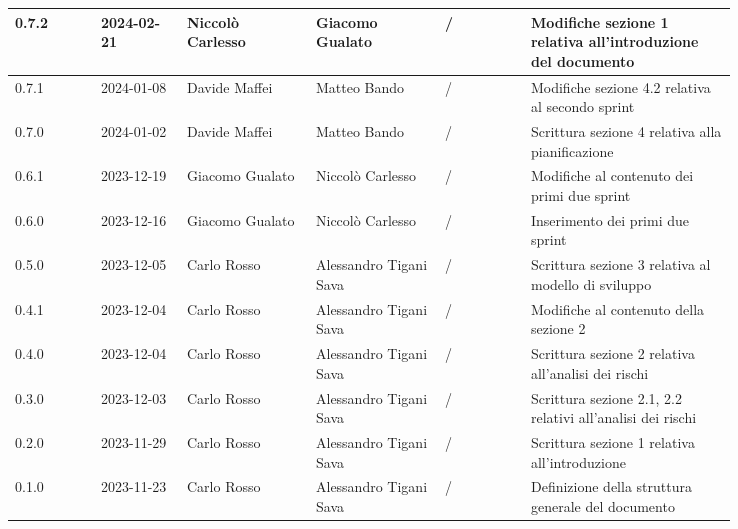 {\begin{longtable}{p{0.10\linewidth}p{0.10\linewidth}p{0.15\linewidth}p{0.15\linewidth}p{0.10\linewidth}p{0.24\linewidth}}
	  \hline
	  0.7.2             & 2024-02-21    & Niccolò Carlesso   & Giacomo Gualato        & /                    & Modifiche sezione 1 relativa all'introduzione del documento       \\
	  \hline
	  0.7.1             & 2024-01-08    & Davide Maffei      & Matteo Bando           & /                    & Modifiche sezione 4.2 relativa al secondo sprint                  \\
	  \hline
	  0.7.0             & 2024-01-02    & Davide Maffei      & Matteo Bando           & /                    & Scrittura sezione 4 relativa alla pianificazione                  \\
	  \hline
	  0.6.1             & 2023-12-19    & Giacomo Gualato    & Niccolò Carlesso       & /                    & Modifiche al contenuto dei primi due sprint                       \\
	  \hline
	  0.6.0             & 2023-12-16    & Giacomo Gualato    & Niccolò Carlesso       & /                    & Inserimento dei primi due sprint                                  \\
	  \hline
	  0.5.0             & 2023-12-05    & Carlo Rosso        & Alessandro Tigani Sava & /                    & Scrittura sezione 3 relativa al modello di sviluppo               \\
	  \hline
	  0.4.1             & 2023-12-04    & Carlo Rosso        & Alessandro Tigani Sava & /                    & Modifiche al contenuto della sezione 2                            \\
	  \hline
	  0.4.0             & 2023-12-04    & Carlo Rosso        & Alessandro Tigani Sava & /                    & Scrittura sezione 2 relativa all'analisi dei rischi               \\
	  \hline
	  0.3.0             & 2023-12-03    & Carlo Rosso        & Alessandro Tigani Sava & /                    & Scrittura sezione 2.1, 2.2 relativi all'analisi dei rischi        \\
	  \hline
	  0.2.0             & 2023-11-29    & Carlo Rosso        & Alessandro Tigani Sava & /                    & Scrittura sezione 1 relativa all'introduzione                     \\
	  \hline
	  0.1.0             & 2023-11-23    & Carlo Rosso        & Alessandro Tigani Sava & /                    & Definizione della struttura generale del documento                \\
	  \bottomrule
  \end{longtable}
 }
